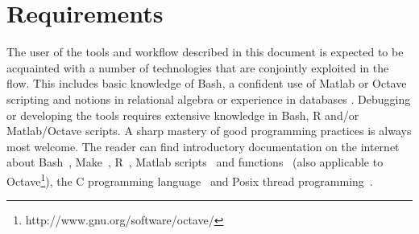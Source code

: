 
\section{Requirements}
The user of the tools and workflow described in this document is expected to be acquainted with a number of technologies that are conjointly exploited in the flow. This includes basic knowledge of Bash, a confident use of Matlab or Octave scripting and notions in relational algebra or experience in databases
. Debugging or developing the tools requires extensive knowledge in Bash, R and/or Matlab/Octave scripts. A sharp mastery of good programming practices is always most welcome. The reader can find introductory documentation on the internet about Bash~\cite{mikeg00,garrels08}, Make~\cite{anonymous_make_1,gnu_make}, R~\cite{r,rdebuts,ggplot2,ggplot2_examples}, Matlab scripts~\cite{huber97} and functions~\cite{recktenw95} (also applicable to Octave\footnote{http://www.gnu.org/software/octave/}), the C programming language~\cite{cprogramming} and Posix thread programming~\cite{tim10,barney12}.

